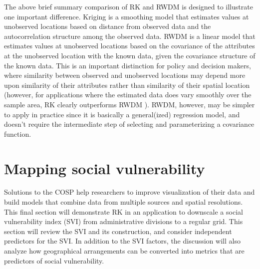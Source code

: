 \documentclass[]{interact}
\theoremstyle{plain}%
\theoremstyle{definition}
\theoremstyle{remark}
\begin{document}
The above brief summary comparison of RK and RWDM is designed to illustrate one important difference.  Kriging is a smoothing model that estimates values at unobserved locations based on distance from observed data and the autocorrelation structure among the observed data.  RWDM is a linear model that estimates values at unobserved locations based on the covariance of the attributes at the unobserved location with the known data, given the covariance structure of the known data.  This is an important distinction for policy and decision makers, where similarity between observed and unobserved locations may depend more upon similarity of their attributes rather than similarity of their spatial location (however, for applications where the estimated data does vary smoothly over the sample area, RK clearly outperforms RWDM \citep{bourennane00}).  RWDM, however, may be simpler to apply in practice since it is basically a general(ized) regression model, and doesn't require the intermediate step of selecting and parameterizing a covariance function.


\section{Mapping social vulnerability} %

Solutions to the COSP help researchers to improve visualization of their data and build models that combine data from multiple sources and spatial resolutions.  This final section will demonstrate RK in an application to downscale a social vulnerability index (SVI) from administrative divisions to a regular grid.  This section will review the SVI and its construction, and consider independent predictors for the SVI.  In addition to the SVI factors, the discussion will also analyze how geographical arrangements can be converted into metrics that are predictors of social vulnerability.
\end{document}
